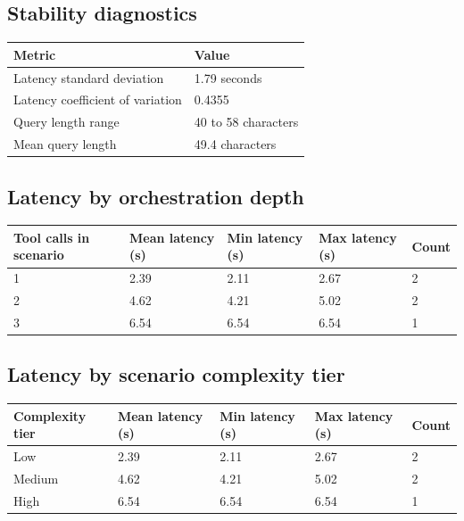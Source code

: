 \documentclass[12pt,a4paper]{article}
\begin{document}
\subsection*{Stability diagnostics}
\begin{longtable}{@{}p{} p{}@{}}
\toprule
Metric & Value \\
\midrule
Latency standard deviation & 1.79 seconds \\
Latency coefficient of variation & 0.4355 \\
Query length range & 40 to 58 characters \\
Mean query length & 49.4 characters \\
\bottomrule
\end{longtable}

\subsection*{Latency by orchestration depth}
\begin{longtable}{@{}p{} p{} p{} p{} p{}@{}}
\toprule
Tool calls in scenario & Mean latency (s) & Min latency (s) & Max latency (s) & Count \\
\midrule
1 & 2.39 & 2.11 & 2.67 & 2 \\
2 & 4.62 & 4.21 & 5.02 & 2 \\
3 & 6.54 & 6.54 & 6.54 & 1 \\
\bottomrule
\end{longtable}

\subsection*{Latency by scenario complexity tier}
\begin{longtable}{@{}p{} p{} p{} p{} p{}@{}}
\toprule
Complexity tier & Mean latency (s) & Min latency (s) & Max latency (s) & Count \\
\midrule
Low & 2.39 & 2.11 & 2.67 & 2 \\
Medium & 4.62 & 4.21 & 5.02 & 2 \\
High & 6.54 & 6.54 & 6.54 & 1 \\
\bottomrule
\end{longtable}
\end{document}
